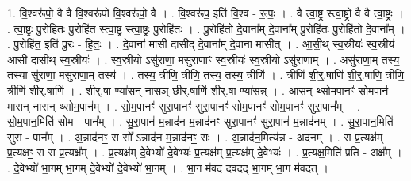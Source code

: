 \documentclass[17pt]{extarticle}
\begin{document}
1. वि॒श्वरू॑पो॒ वै वै वि॒श्वरू॑पो वि॒श्वरू॑पो॒ वै । . वि॒श्वरू॑प॒ इति॑ वि॒श्व - रू॒पः॒ । . वै त्वा॒ष्ट्र स्त्वा॒ष्ट्रो वै वै त्वा॒ष्ट्रः । . त्वा॒ष्ट्रः पु॒रोहि॑तः पु॒रोहि॑त स्त्वा॒ष्ट्र स्त्वा॒ष्ट्रः पु॒रोहि॑तः । . पु॒रोहि॑तो दे॒वाना᳚म् दे॒वाना᳚म् पु॒रोहि॑तः पु॒रोहि॑तो दे॒वाना᳚म् । . पु॒रोहि॑त॒ इति॑ पु॒रः - हि॒तः॒ । . दे॒वाना॑ मासी दासीद् दे॒वाना᳚म् दे॒वाना॑ मासीत् । . आ॒सी॒थ् स्व॒स्रीयः॑ स्व॒स्रीय॑ आसी दासीथ् स्व॒स्रीयः॑ । . स्व॒स्रीयो ऽसु॑राणा॒ मसु॑राणाꣳ स्व॒स्रीयः॑ स्व॒स्रीयो ऽसु॑राणाम् । . असु॑राणा॒म् तस्य॒ तस्या सु॑राणा॒ मसु॑राणा॒म् तस्य॑ । . तस्य॒ त्रीणि॒ त्रीणि॒ तस्य॒ तस्य॒ त्रीणि॑ । . त्रीणि॑ शी॒र्॒.षाणि॑ शी॒र्॒.षाणि॒ त्रीणि॒ त्रीणि॑ शी॒र्॒.षाणि॑ । . शी॒र्॒.षा ण्या॑सन् नासञ् छी॒र्॒.षाणि॑ शी॒र्॒.षा ण्या॑सन्न् । . आ॒स॒न् थ्सो॒म॒पानꣳ॑ सोम॒पान॑ मासन् नासन् थ्सोम॒पान᳚म् । . सो॒म॒पानꣳ॑ सुरा॒पानꣳ॑ सुरा॒पानꣳ॑ सोम॒पानꣳ॑ सोम॒पानꣳ॑ सुरा॒पान᳚म् । . सो॒म॒पान॒मिति॑ सोम - पान᳚म् । . सु॒रा॒पान॑ म॒न्नाद॑न म॒न्नाद॑नꣳ सुरा॒पानꣳ॑ सुरा॒पान॑ म॒न्नाद॑नम् । . सु॒रा॒पान॒मिति॑ सुरा - पान᳚म् । . अ॒न्नाद॑नꣳ॒॒ स सो᳚ ऽन्नाद॑न म॒न्नाद॑नꣳ॒॒ सः । . अ॒न्नाद॑न॒मित्य॑न्न - अद॑नम् । . स प्र॒त्यक्ष॑म् प्र॒त्यक्षꣳ॒॒ स स प्र॒त्यक्ष᳚म् । . प्र॒त्यक्ष॑म् दे॒वेभ्यो॑ दे॒वेभ्यः॑ प्र॒त्यक्ष॑म् प्र॒त्यक्ष॑म् दे॒वेभ्यः॑ । . प्र॒त्यक्ष॒मिति॑ प्रति - अक्ष᳚म् । . दे॒वेभ्यो॑ भा॒गम् भा॒गम् दे॒वेभ्यो॑ दे॒वेभ्यो॑ भा॒गम् । . भा॒ग म॑वद दवदद् भा॒गम् भा॒ग म॑वदत् । \newline
\end{document}
